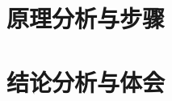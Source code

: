 \documentclass{../../../../Cls/SDU/ExpReport/BlockChain/BlockChain}
\begin{document}
\begin{sduDocument}
\section{原理分析与步骤}
\section{结论分析与体会}
\sduAppendix

\end{sduDocument}
\end{document}

